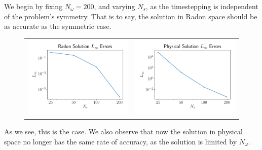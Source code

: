 We begin by fixing $N_\omega = 200$, and varying $N_s$, as the timestepping is independent of the problem's symmetry.
That is to say, the solution in Radon space should be as accurate as the symmetric case.
\begin{center}
\begin{figure}[H]
\begin{tabular}{cc}                    
    \includegraphics[height=0.35\linewidth]{figures/Convergence_Radon_Errors_Ns.pdf} &
    \includegraphics[height=0.35\linewidth]{figures/Convergence_Physical_Errors_Ns.pdf}
\end{tabular}
\end{figure}
\end{center}
As we see, this is the case.
We also observe that now the solution in physical space no longer has the same rate of accuracy, as the solution is limited by $N_\omega$.

